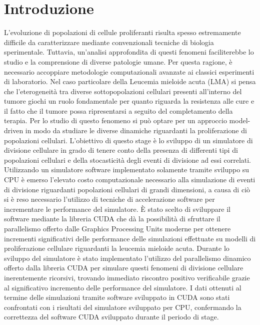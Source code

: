 
\chapter{Introduzione} %

\label{Introduzione} %



L’evoluzione di popolazioni di cellule proliferanti risulta spesso estremamente
difficile da caratterizzare mediante convenzionali tecniche di biologia
sperimentale. Tuttavia, un’analisi approfondita di questi fenomeni
faciliterebbe lo studio e la comprensione di diverse patologie umane.
Per questa ragione, è necessario accoppiare metodologie computazionali 
avanzate ai classici esperimenti di laboratorio. Nel caso particolare della 
Leucemia mieloide acuta (LMA) si pensa che l'eterogeneità tra diverse 
sottopopolazioni cellulari presenti all'interno del tumore giochi un ruolo 
fondamentale per quanto riguarda la resistenza alle cure e il fatto che il 
tumore possa ripresentarsi a seguito del completamento della terapia.
Per lo studio di questo fenomeno si può optare per un approccio model-driven 
in modo da studiare le diverse dinamiche riguardanti la proliferazione di 
popolazioni cellulari. L'obiettivo di questo stage è lo sviluppo di un 
simulatore di divisione cellulare in grado di tenere conto della presenza 
di differenti tipi di popolazioni cellulari e della stocasticità degli eventi
di divisione ad essi correlati. Utilizzando un simulatore software implementato 
solamente tramite sviluppo su CPU è emerso l'elevato costo 
computazionale necessario alla simulazione di eventi di divisione riguardanti 
popolazioni cellulari di grandi dimensioni, a causa di ciò si è reso necessario 
l'utilizzo di tecniche di accelerazione software per incrementare le 
performance del simulatore. È stato scelto di sviluppare il software 
mediante la libreria CUDA che dà la possibilità di sfruttare il parallelismo 
offerto dalle Graphics Processing Units moderne per ottenere incrementi 
significativi delle performance delle simulazioni effettuate su modelli di 
proliferazione cellulare riguardanti la leucemia mieloide acuta.
Durante lo sviluppo del simulatore è stato implementato l'utilizzo del 
parallelismo dinamico offerto dalla libreria CUDA per simulare questi fenomeni 
di divisione cellulare inerentemente ricorsivi, trovando immediato riscontro 
positivo verificabile grazie al significativo incremento delle performance 
del simulatore. I dati ottenuti al termine delle simulazioni tramite software 
sviluppato in CUDA sono stati confrontati con i risultati del simulatore 
sviluppato per CPU, confermando la correttezza del software CUDA sviluppato 
durante il periodo di stage.
